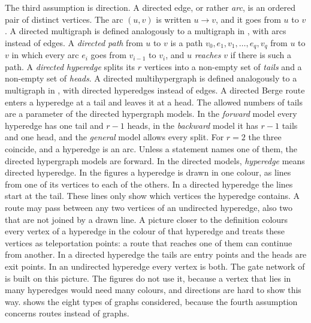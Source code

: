 The third assumption is direction.
A directed edge, or rather \emph{arc}, is an ordered pair of distinct vertices. The arc $(u,v)$ is written $u\to v$, and it goes from $u$ to $v$.
A directed multigraph is defined analogously to a multigraph in , with arcs instead of edges.
A \emph{directed path} from $u$ to $v$ is a path $v_0,e_1,v_1,\ldots,e_q,v_q$ from $u$ to $v$ in which every arc $e_i$ goes from $v_{i-1}$ to $v_i$, and $u$ \emph{reaches} $v$ if there is such a path.
A \emph{directed hyperedge} splits its $r$ vertices into a non-empty set of \emph{tails} and a non-empty set of \emph{heads}.
A directed multihypergraph is defined analogously to a multigraph in , with directed hyperedges instead of edges.
A directed Berge route enters a hyperedge at a tail and leaves it at a head.
The allowed numbers of tails are a parameter of the directed hypergraph models.
In the \emph{forward} model every hyperedge has one tail and $r-1$ heads, in the \emph{backward} model it has $r-1$ tails and one head, and the \emph{general} model allows every split.
For $r=2$ the three coincide, and a hyperedge is an arc.
Unless a statement names one of them, the directed hypergraph models are forward.
In the directed models, \emph{hyperedge} means directed hyperedge.
In the figures a hyperedge is drawn in one colour, as lines from one of its vertices to each of the others. In a directed hyperedge the lines start at the tail. These lines only show which vertices the hyperedge contains. A route may pass between any two vertices of an undirected hyperedge, also two that are not joined by a drawn line.
A picture closer to the definition colours every vertex of a hyperedge in the colour of that hyperedge and treats these vertices as teleportation points: a route that reaches one of them can continue from another. In a directed hyperedge the tails are entry points and the heads are exit points. In an undirected hyperedge every vertex is both. The gate network of  is built on this picture.
The figures do not use it, because a vertex that lies in many hyperedges would need many colours, and directions are hard to show this way.
 shows the eight types of graphs considered, because the fourth assumption concerns routes instead of graphs.

